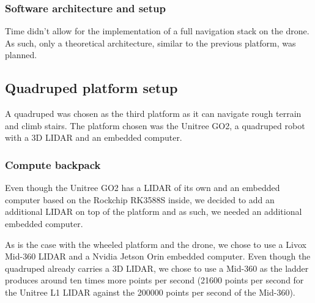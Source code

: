 \documentclass[11pt]{article}
\begin{document}
            \subsubsection{Software architecture and setup}
                
                Time didn't allow for the implementation of a full navigation stack on the drone. As such, only a theoretical architecture, similar to the previous platform, was planned.
        
            
    \subsection{Quadruped platform setup}

        A quadruped was chosen as the third platform as it can navigate rough terrain and climb stairs. The platform chosen was the Unitree GO2, a quadruped robot with a 3D LIDAR and an embedded computer.

        \subsubsection{Compute backpack}

        Even though the Unitree GO2 has a LIDAR of its own and an embedded computer based on the Rockchip RK3588S inside, we decided to add an additional LIDAR on top of the platform and as such, we needed an additional embedded computer.

        As is the case with the wheeled platform and the drone, we chose to use a Livox Mid-360 LIDAR and a Nvidia Jetson Orin embedded computer. Even though the quadruped already carries a 3D LIDAR, we chose to use a Mid-360 as the ladder produces around ten times more points per second (21600 points per second for the Unitree L1 LIDAR against the 200000 points per second of the Mid-360).
\end{document}
